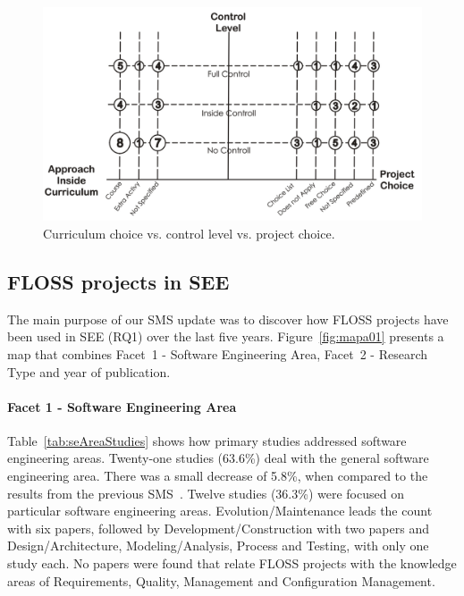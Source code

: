 \begin{figure}[htb]
\includegraphics[width=0.7\linewidth]{fig/mapa02.jpg}
\caption{Curriculum choice vs. control level vs. project choice.} \label{fig:mapa03}
\end{figure}

\subsection{FLOSS projects in SEE}

The main purpose of our SMS update was to discover 
how FLOSS projects have been used in SEE (RQ1) 
over the last five years. 
Figure~\ref{fig:mapa01} presents a map 
that combines Facet~1 - Software Engineering Area, 
Facet~2 - Research Type and year of publication.



\paragraph{Facet 1 - Software Engineering Area}
Table~\ref{tab:seAreaStudies} shows how primary studies addressed software engineering areas.
Twenty-one studies (63.6\%) deal with the general software engineering area. There was a small decrease of 5.8\%, 
when compared to the results from the previous SMS~\cite{2015:CSE:nascimento}. 
Twelve studies (36.3\%)  were focused on particular software engineering areas. 
Evolution/Maintenance leads the count with six papers, followed by Development/Construction with two papers and 
Design/Architecture, Modeling/Analysis, Process and Testing,
with only one study each.
No papers were found that relate FLOSS projects with the knowledge areas of
Requirements, Quality, Management and Configuration Management.



